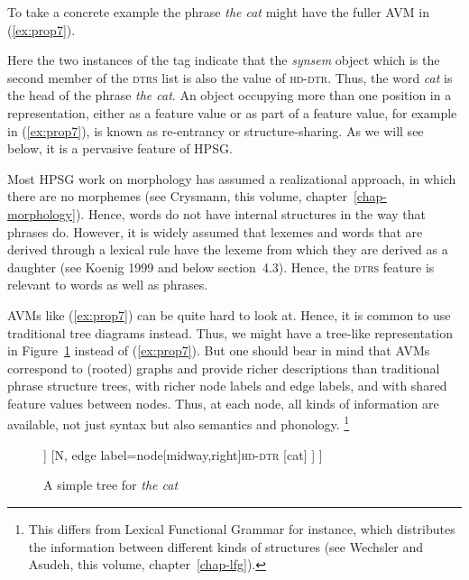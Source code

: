 \documentclass[output=paper
	        ,collection
	        ,collectionchapter
 	        ,biblatex
                ,babelshorthands
                ,newtxmath
                ,draftmode
                ,colorlinks, citecolor=brown
]{langscibook}
\begin{document}
To take a concrete example the phrase \emph{the cat} might have the fuller AVM in (\ref{ex:prop7}).

\ea\label{ex:prop7}
\z

Here the two instances of the tag \avmtmp{\1} indicate that the \emph{synsem} object which is the second member of the \textsc{dtrs} list is also the value of \textsc{hd-dtr}. Thus, the word \emph{cat} is the head of the phrase \emph{the cat}. An object occupying more than one position in a representation, either as a feature value or as part of a feature value, for example \avmtmp{\1} in (\ref{ex:prop7}), is known as re-entrancy or structure-sharing. As we will see below, it is a pervasive feature of HPSG.

Most HPSG work on morphology has assumed a realizational approach, in which there are no morphemes (see Crysmann, this volume, chapter~\ref{chap-morphology}). Hence, words do not have internal structures in the way that phrases do. However, it is widely assumed that lexemes and words that are derived through a lexical rule have the lexeme from which they are derived as a daughter (see Koenig 1999 and below section~4.3). Hence, the \textsc{dtrs} feature is relevant to words as well as phrases.

AVMs like (\ref{ex:prop7}) can be quite hard to look at. Hence, it is common to use traditional tree diagrams instead. Thus, we might have a tree-like representation in Figure~\ref{fig:prop2} instead of (\ref{ex:prop7}). But one should bear in mind that AVMs correspond to (rooted) graphs and provide richer descriptions than traditional phrase structure trees, with richer node labels and edge labels, and with shared feature values between nodes. Thus, at each node, all kinds of information are available, not just syntax but also semantics and phonology.%
%
\footnote{This differs from Lexical Functional Grammar for instance, which distributes the information between different kinds of structures (see Wechsler and Asudeh, this volume, chapter~\ref{chap-lfg}).}
%

\begin{figure}[h!]
\begin{forest}
[NP
	[Det
		[the]
	]
	[N, edge label={node[midway,right]{\textsc{hd-dtr}}}
		[cat]
	]
]
\end{forest}
	
\caption{A simple tree for \emph{the cat}}\label{fig:prop2}
\end{figure}
\end{document}
